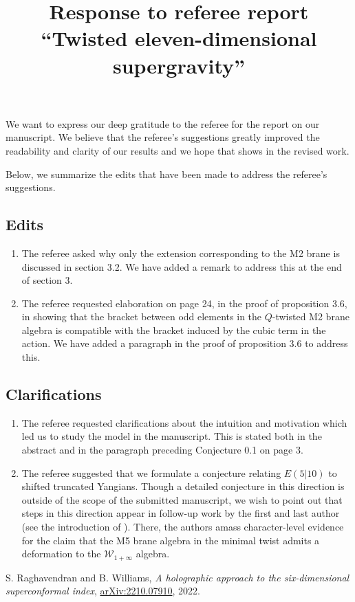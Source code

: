 \documentclass{amsart}
\begin{document}
\title{Response to referee report \\ ``Twisted eleven-dimensional supergravity''}

\maketitle

We want to express our deep gratitude to the referee for the report on our manuscript. We believe that the referee's suggestions greatly improved the readability and clarity of our results and we hope that shows in the revised work.

Below, we summarize the edits that have been made to address the referee's suggestions.

\subsection*{Edits}
\begin{enumerate}
\item The referee asked why only the extension corresponding to the M2 brane is discussed in section 3.2. We have added a remark to address this at the end of section 3. \\

\item The referee requested elaboration on page 24, in the proof of proposition 3.6, in showing that the bracket between odd elements in the $Q$-twisted M2 brane algebra is compatible with the bracket induced by the cubic term in the action. We have added a paragraph in the proof of proposition 3.6 to address this.
\end{enumerate}

\subsection*{Clarifications}
\begin{enumerate}
\item The referee requested clarifications about the intuition and motivation which led us to study the model in the manuscript. This is stated both in the abstract and in the paragraph preceding Conjecture 0.1 on page 3. \\

\item The referee suggested that we formulate a conjecture relating $E(5|10)$ to shifted truncated Yangians. Though a detailed conjecture in this direction is outside of the scope of the submitted manuscript, we wish to point out that steps in this direction appear in follow-up work by the first and last author (see the introduction of \cite{RW22}). There, the authors amass character-level evidence for the claim that the M5 brane algebra in the minimal twist admits a deformation to the $\mathcal{W}_{1+\infty}$ algebra. 

\end{enumerate}

\begin{thebibliography}{9}
	S. Raghavendran and B. Williams,
	\textit{A holographic approach to the six-dimensional superconformal index},
	\url{arXiv:2210.07910},
	2022.

\end{thebibliography}
\end{document}

